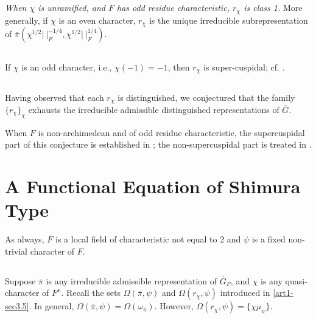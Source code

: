 \subsection{}\label{art1-sec4.3}
{\em When $\chi$ is unramified, and $F$ has odd residue characteristic, $r_{\chi}$ is class 1.} More generally, if $\chi$ is an even character, $r_{\chi}$ is the unique irreducible subrepresentation of $\overline{\pi}(\chi^{1/2}|~|^{-1/4}_{F},\chi^{1/2}|~|_{F}^{1/4})$.

\subsection{}\label{art1-sec4.4}\pageoriginale
If $\chi$ is an odd character, i.e., $\chi(-1)=-1$, then $r_{\chi}$ is super-cuspidal; cf. \cite{Ge}.

\subsection{}\label{art1-sec4.5}
Having observed that each $r_{\chi}$ is distinguished, we conjectured that the family $\{r_{\chi}\}_{\chi}$ exhausts the irreducible admissible distinguished representations of $\overline{G}$.

When $F$ is non-archimedean and of odd residue characteristic, the supercuspidal part of this conjecture is established in \cite{Meister}; the non-supercuspidal part is treated in \cite{GePS2}.

\section{A Functional Equation of Shimura Type}\label{art1-sec5}

As always, $F$ is a local field of characteristic not equal to 2 and $\psi$ is a fixed non-trivial character of $F$.

\subsection{}\label{art1-sec5.1}
Suppose $\overline{\pi}$ is any irreducible admissible representation of $\overline{G}_{F}$, and $\chi$ is any quasi-character of $F^{x}$. Recall the sets $\Omega(\overline{\pi},\psi)$ and $\Omega(r_{\chi},\psi)$ introduced in \eqref{art1-sec3.5}. In general, $\Omega(\overline{\pi},\psi)=\Omega(\omega_{\overline{\pi}})$. However, $\Omega(r_{\chi},\psi)=\{\chi \mu_{\psi}\}$.


